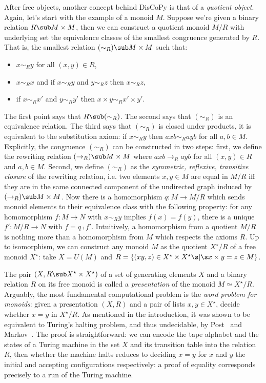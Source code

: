 After free objects, another concept behind DisCoPy is that of a \emph{quotient object}.
Again, let's start with the example of a monoid $M$.
Suppose we're given a binary relation $R \sub M \times M$, then we can construct a quotient monoid $M / R$ with underlying set the equivalence classes of the smallest congruence generated by $R$.
That is, the smallest relation $(\sim_R) \sub M \times M$ such that:
\begin{itemize}
\item $x \sim_R y$ for all $(x, y) \in R$,
\item $x \sim_R x$ and if $x \sim_R y$ and $y \sim_R z$ then $x \sim_R z$,
\item if $x \sim_R x'$ and $y \sim_R y'$ then $x \times y \sim_R x' \times y'$.
\end{itemize}
The first point says that $R \sub (\sim_R)$.
The second says that $(\sim_R)$ is an equivalence relation.
The third says that $(\sim_R)$ is closed under products, it is equivalent to the substitution axiom: if $x \sim_R y$ then $a x b \sim_R a y b$ for all $a, b \in M$.
Explicitly, the congruence $(\sim_R)$ can be constructed in two steps: first, we define the rewriting relation $(\to_R) \sub M \times M$ where $a x b \to_R a y b$ for all $(x, y) \in R$ and $a, b \in M$.
Second, we define $(\sim_R)$ as the \emph{symmetric, reflexive, transitive closure} of the rewriting relation, i.e. two elements $x, y \in M$ are equal in $M / R$ iff they are in the same connected component of the undirected graph induced by $(\to_R) \sub M \times M$.
Now there is a homomorphism $q : M \to M / R$ which sends monoid elements to their equivalence class with the following property: for any homomorphism $f : M \to N$ with $x \sim_R y$ implies $f(x) = f(y)$, there is a unique $f' : M / R \to N$ with $f = q \fcmp f'$.
Intuitively, a homomorphism from a quotient $M / R$ is nothing more than a homomorphism from $M$ which respects the axioms $R$.
Up to isomorphism, we can construct any monoid $M$ as the quotient $X^\star / R$ of a free monoid $X^\star$: take $X = U(M)$ and $R = \{ (x y, z) \in X^\star \times X^\star \s \vert \s x \times y = z \in M \}$.

The pair $(X, R \sub X^\star \times X^\star)$ of a set of generating elements $X$ and a binary relation $R$ on its free monoid is called a \emph{presentation} of the monoid $M \simeq X^\star / R$.
Arguably, the most fundamental computational problem is the \emph{word problem for monoids}: given a presentation $(X, R)$ and a pair of lists $x, y \in X^\star$, decide whether $x = y$ in $X^\star / R$.
As mentioned in the introduction, it was shown to be equivalent to Turing's halting problem, and thus undecidable, by Post~\cite{Post47} and Markov~\cite{Markov47}.
The proof is straightforward: we can encode the tape alphabet and the states of a Turing machine in the set $X$ and its transition table into the relation $R$, then whether the machine halts reduces to deciding $x = y$ for $x$ and $y$ the initial and accepting configurations respectively: a proof of equality corresponds precisely to a run of the Turing machine.

